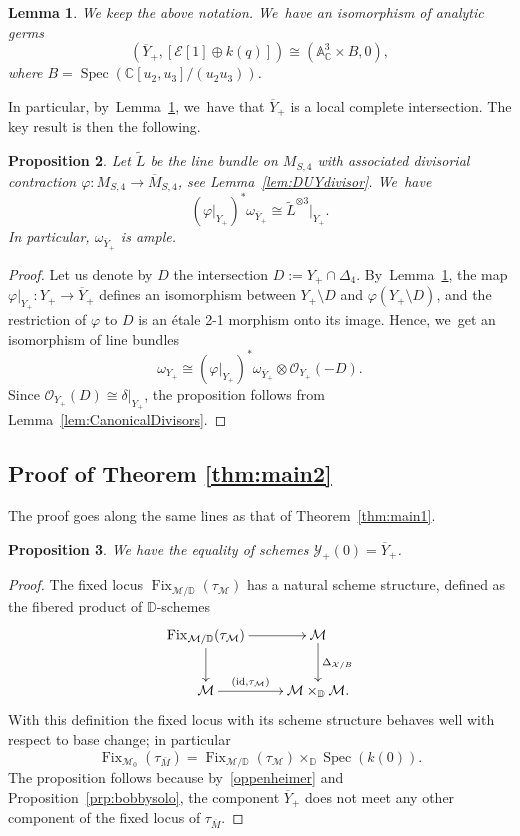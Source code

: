 \documentclass[11pt]{article}
\newcommand{\CC}{{\mathbb C}}\let\C\CC
\newcommand{\DD}{{\mathbb D}}
\newcommand\cE{\mathcal{E}}
\newcommand\cM{\mathcal{M}}
\newcommand\cO{\mathcal{O}}
\newcommand\cY{\mathcal{Y}}
\DeclareMathOperator{\Fix}{Fix}
\DeclareMathOperator{\Spec}{Spec}
\let\ov\overline
\let\phi\varphi
\newtheorem{lemm}{Lemma}[section]
\newtheorem{prop}[lemm]{Proposition}
\theoremstyle{definition}
\begin{document}
\begin{lemm}\label{lem:AnalyticFixedLocusDim4}
We keep the above notation. We~have an isomorphism of analytic germs
\[
\left(\overline{Y}_+,[\cE[1]\oplus k(q)] \right)\cong(\mathbb{A}^3_{\CC} \times B, 0),
\]
where $B=\Spec(\CC[u_2,u_3]/(u_2u_3))$.
\end{lemm}

In particular, by~Lemma~\ref{lem:AnalyticFixedLocusDim4}, we~have that $\overline{Y}_+$ is a local complete intersection.
The key result is then the following.

\begin{prop}\label{prop:CanonicalBundleFixedLocus}
Let $\widetilde{L}$ be the line bundle on $M_{S,4}$ with associated divisorial contraction $\phi\colon M_{S,4}\to \ov{M}_{S,4}$, see Lemma~\ref{lem:DUYdivisor}. We~have
\[
(\phi\vert_{Y_+})^*\omega_{\overline{Y}_+} \cong \widetilde{L}^{\otimes 3}\vert_{Y_+}.
\]
In particular, $\omega_{\overline{Y}_+}$ is ample.
\end{prop}

\begin{proof}
Let us denote by $D$ the intersection $D:=Y_+\cap \Delta_4$. By~Lemma~\ref{lem:AnalyticFixedLocusDim4}, the map $\phi\vert_{Y_+}\colon Y_+\to \overline{Y}_+$
defines an isomorphism between $Y_+\setminus D$ and $\phi(Y_+\setminus D)$, and the restriction of $\phi$ to $D$
is an étale 2-1 morphism onto its image.
Hence, we~get an isomorphism of line bundles
\[
\omega_{Y_+} \cong (\phi\vert_{Y_+})^*\omega_{\overline{Y}_+} \otimes \cO_{Y_+}(-D).
\]
Since $\cO_{Y_+}(D) \cong \delta\vert_{Y_+}$, the proposition follows from Lemma~\ref{lem:CanonicalDivisors}.
\end{proof}

\subsection{Proof of Theorem \ref{thm:main2}}\label{subsec:ProofMainThm2}

The proof goes along the same lines as that of Theorem~\ref{thm:main1}.

\begin{prop}\label{prop:fixreduced}
We have the equality of schemes $\cY_{+}(0)=\overline{Y}_+$.
\end{prop}

\begin{proof}
The fixed locus $\Fix_{\mathcal{M}/\DD}(\tau_{\cM})$ has a natural scheme structure, defined as the fibered product of $\DD$-schemes
\[
\xymatrix{
\Fix_{\mathcal{M}/\DD}(\tau_{\mathcal{M}})\ar[d] \ar[r] &\mathcal{M} \ar[d]^{\Delta_{\mathcal{X}/B}}\\
\mathcal{M} \ar[r]^-{(\mathrm{id},\tau_{\mathcal{M}})} &\mathcal{M}\times_{\DD} \mathcal{M}.
}
\]
With this definition the fixed locus with its scheme structure behaves well with respect to base change; in particular
\[
\Fix_{\mathcal{M}_0}(\tau_{\ov{M}}) = \Fix_{\mathcal{M}/\DD}(\tau_{\mathcal{M}})
\times_{\DD} \Spec(k(0)).
\]
The proposition follows because by~\eqref{oppenheimer} and Proposition~\ref{prp:bobbysolo}, the component $\overline{Y}_+$ does not meet any other component of the fixed locus of $\tau_{\ov{M}}$.
\end{proof}
\end{document}
